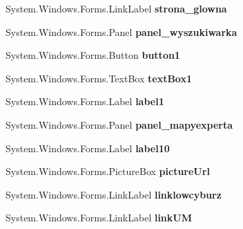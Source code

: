 \begin{DoxyCompactItemize}
System.\+Windows.\+Forms.\+Link\+Label {\bfseries strona\+\_\+glowna}
\item 
\mbox{\label{class_pogodynka__w57003_1_1panel__glony_ac07c311ba786842eabc8b1118ca50b4a}} 
System.\+Windows.\+Forms.\+Panel {\bfseries panel\+\_\+wyszukiwarka}
\item 
\mbox{\label{class_pogodynka__w57003_1_1panel__glony_aa5f884175ac19d6e5fdc5ecd26c8810d}} 
System.\+Windows.\+Forms.\+Button {\bfseries button1}
\item 
\mbox{\label{class_pogodynka__w57003_1_1panel__glony_a8733580cb653bba74fe6992208d67eec}} 
System.\+Windows.\+Forms.\+Text\+Box {\bfseries text\+Box1}
\item 
\mbox{\label{class_pogodynka__w57003_1_1panel__glony_a86d8ce605dfefac97907f8628ad61376}} 
System.\+Windows.\+Forms.\+Label {\bfseries label1}
\item 
\mbox{\label{class_pogodynka__w57003_1_1panel__glony_a94257d57fec9910be6f49eab493eacd4}} 
System.\+Windows.\+Forms.\+Panel {\bfseries panel\+\_\+mapyexperta}
\item 
\mbox{\label{class_pogodynka__w57003_1_1panel__glony_a13945d443b47a425c1b68798f9a8edc2}} 
System.\+Windows.\+Forms.\+Label {\bfseries label10}
\item 
\mbox{\label{class_pogodynka__w57003_1_1panel__glony_af7290e98cc6f073fe1d11ed48bbf4dd7}} 
System.\+Windows.\+Forms.\+Picture\+Box {\bfseries picture\+Url}
\item 
\mbox{\label{class_pogodynka__w57003_1_1panel__glony_a595a9ec7a6671e16bb09af20a1311602}} 
System.\+Windows.\+Forms.\+Link\+Label {\bfseries linklowcyburz}
\item 
\mbox{\label{class_pogodynka__w57003_1_1panel__glony_a8623f7e3a7fc4b9246488385ce37318b}} 
System.\+Windows.\+Forms.\+Link\+Label {\bfseries link\+UM}

\end{DoxyCompactItemize}
